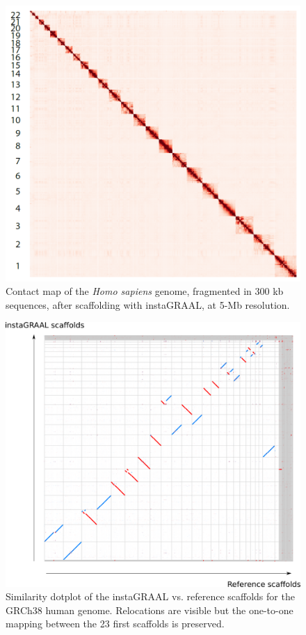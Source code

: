 \begin{suppsection}
\begin{figure}[ht]
\centering
    \includegraphics[width=13.5cm]{fig/instagraal/s9.png}
    \caption{Contact map of the \textit{Homo sapiens} genome, fragmented in 300 kb sequences, after scaffolding with instaGRAAL, at 5-Mb resolution.}
    \label{fig:instagraal_s9}
\end{figure}

\begin{figure}[ht]
\centering
    \includegraphics[width=13.5cm]{fig/instagraal/s10.png}
    \caption{Similarity dotplot of the instaGRAAL vs. reference scaffolds for the GRCh38 human genome. Relocations are visible but the one-to-one mapping between the 23 first scaffolds is preserved.}
    \label{fig:instagraal_s10}
\end{figure}


\end{suppsection}
